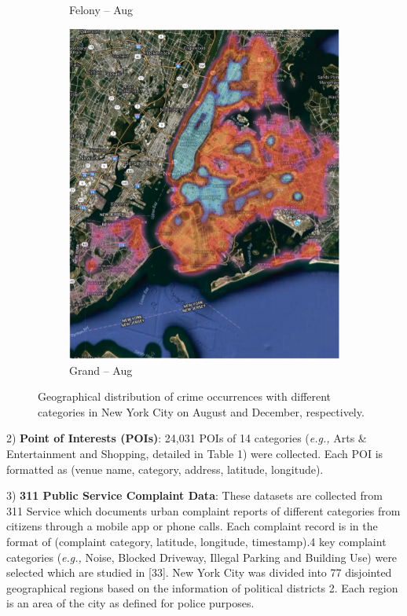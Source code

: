 \begin{figure}[t]
\begin{subfigure}{0.24\textwidth}
\caption{Felony – Aug}
\label{fig:subim3}
\end{subfigure}
\begin{subfigure}{0.24\textwidth}
\centering
\includegraphics[width=0.9\linewidth]{Chapter5/Images/grand.png}
\caption{Grand – Aug}
\label{fig:subim4}
\end{subfigure}
 
\caption{Geographical distribution of crime occurrences with different categories in New York City on August and December,
respectively.}
\label{fig:img2}
\end{figure}

2) \textbf{Point of Interests (POIs)}: 24,031 POIs of 14
categories (\emph{e.g.,} Arts \& Entertainment and Shopping, detailed in
Table 1) were collected. Each POI is formatted as (venue name, category, address, latitude, longitude).

3) \textbf{311 Public Service Complaint Data}: These datasets are collected from 311 Service which documents urban complaint reports
of different categories from citizens through a mobile app or phone
calls. Each complaint record is in the format of (complaint category,
latitude, longitude, timestamp).4 key complaint categories (\emph{e.g.,} Noise, Blocked Driveway, Illegal Parking and Building
Use) were selected which are studied in [33].
New York City was divided into 77 disjointed geographical regions based on the information of political districts 2. Each region
is an area of the city as defined for police purposes.

